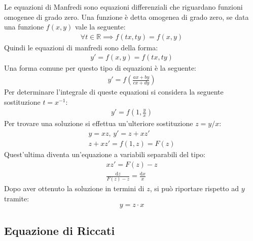 \documentclass{article}
\newcommand{\df}{\mathrm{d}}
\numberwithin{equation}{subsection}
\begin{document}
Le equazioni di Manfredi sono equazioni differenziali che riguardano funzioni omogenee di grado zero. Una funzione è detta omogenea di grado zero, se data una funzione $f(x,y)$ vale la seguente:
\begin{gather*}
    \forall t\in\mathbb{R}\implies f(tx,ty)=f(x,y)    
\end{gather*}
Quindi le equazioni di manfredi sono della forma:
\begin{gather}
    y'=f(x,y)=f(tx,ty)
\end{gather}
Una forma comune per questo tipo di equazioni è la seguente:
\begin{gather*}
    y'=f\left(\frac{ax+by}{cx+dy}\right)
\end{gather*}
Per determinare l'integrale di queste equazioni si considera la seguente sostituzione $t=x^{-1}$:
\begin{gather*}
    y'=f\left(1,\displaystyle\frac{y}{x}\right)
\end{gather*}
Per trovare una soluzione si effettua un'ulteriore sostituzione $z=y/x$:
\begin{gather*}
    y=xz,\,y'=z+xz'\\
    z+xz'=f(1,z)=F(z)
\end{gather*}
Quest'ultima diventa un'equazione a variabili separabili del tipo:
\begin{gather*}
    xz'=F(z)-z\\
    \displaystyle\frac{\df z}{F(z)-z}=\frac{\df x}{x}
\end{gather*}
Dopo aver ottenuto la soluzione in termini di $z$, si può riportare rispetto ad $y$ tramite:
\begin{equation}
    y=z\cdot x
\end{equation}

\subsection{Equazione di Riccati}
\end{document}
